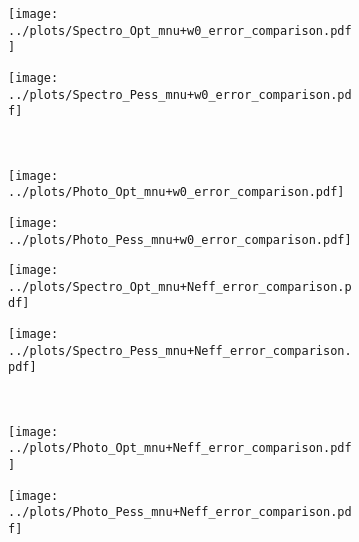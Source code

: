 \documentclass[../main.tex]{subfiles}
\begin{document}
\begin{figure}
    \centering
    \caption{Same as figure \ref{fig:Comparison_w0wa} but for the $w_0$CDM+$m_\nu$ model}
    \begin{subfigure}[b]{0.49\textwidth}
        \centering
        \texttt{[image: ../plots/Spectro\_Opt\_mnu+w0\_error\_comparison.pdf]}
    \end{subfigure}
    \hfill
    \begin{subfigure}[b]{0.49\textwidth}
        \centering
        \texttt{[image: ../plots/Spectro\_Pess\_mnu+w0\_error\_comparison.pdf]}
    \end{subfigure}\\
    \begin{subfigure}[b]{0.49\textwidth}
        \centering
        \texttt{[image: ../plots/Photo\_Opt\_mnu+w0\_error\_comparison.pdf]}
    \end{subfigure}
    \hfill
    \begin{subfigure}[b]{0.49\textwidth}
        \centering
        \texttt{[image: ../plots/Photo\_Pess\_mnu+w0\_error\_comparison.pdf]}
    \end{subfigure}    
       \label{fig:Comparison_w0M} 
\end{figure}
\begin{figure}
    \centering
    \caption{Same as figure \ref{fig:Comparison_w0wa} but for the $\Lambda$CDM+$m_\nu+\neff$ model}
    \begin{subfigure}[b]{0.49\textwidth}
        \centering
        \texttt{[image: ../plots/Spectro\_Opt\_mnu+Neff\_error\_comparison.pdf]}
    \end{subfigure}
    \hfill
    \begin{subfigure}[b]{0.49\textwidth}
        \centering
        \texttt{[image: ../plots/Spectro\_Pess\_mnu+Neff\_error\_comparison.pdf]}
    \end{subfigure}\\
    \begin{subfigure}[b]{0.49\textwidth}
        \centering
        \texttt{[image: ../plots/Photo\_Opt\_mnu+Neff\_error\_comparison.pdf]}
    \end{subfigure}
    \hfill
    \begin{subfigure}[b]{0.49\textwidth}
        \centering
        \texttt{[image: ../plots/Photo\_Pess\_mnu+Neff\_error\_comparison.pdf]}
    \end{subfigure}    
       \label{fig:Comparison_MN} 
\end{figure}
\end{document}
